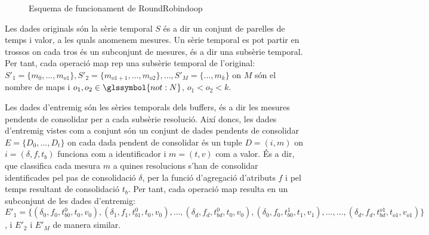 \begin{figure}[tp]
  
  \caption{Esquema de funcionament de RoundRobindoop}
  \label{fig:roundrobindoop:esquema}
\end{figure}






Les dades originals són la sèrie temporal $S$ és a dir un conjunt de
parelles de temps i valor, a les quals anomenem mesures. Un sèrie
temporal es pot partir en trossos on cada tros és un subconjunt de
mesures, és a dir una subsèrie temporal. Per tant, cada operació map
rep una subsèrie temporal de l'original: $S'_1 =
\{m_0,\dotsc,m_{o1}\}, S'_2 = \{m_{o1+1},\dotsc,m_{o2}\}, \dotsc, S'_M
= \{\dotsc,m_{k}\}$ on $M$ són el nombre de maps i $o_1,o_2\in
\glssymbol{not:N}$, $o_1 < o_2 < k$.



Les dades d'entremig són les sèries temporals dels buffers, és a dir
les mesures pendents de consolidar per a cada subsèrie resolució.
Així doncs, les dades d'entremig vistes com a conjunt són un conjunt
de dades pendents de consolidar $E=\{ D_{0}, \dotsc, D_t\}$  on cada dada pendent de consolidar és un tuple
$D=(i,m)$ on $i=(\delta,f,t_b)$ funciona com a identificador i
$m=(t,v)$ com a valor.  És a dir, que classifica cada mesura $m$ a
quines resolucions s'han de consolidar identificades pel pas de
consolidació $\delta$, per la funció d'agregació d'atributs $f$ i pel
temps resultant de consolidació $t_b$. Per tant, cada operació map
resulta en un subconjunt de les dades d'entremig: $E'_1=\{
(\delta_0,f_0, t_{b0}^0, t_0,v_0), (\delta_1,f_1, t_{b1}^0, t_0,v_0),
\dotsc , (\delta_d,f_d, t_{bd}^0, t_0,v_0), (\delta_0,f_0, t_{b0}^1,
t_1,v_1), \dotsc, \dotsc, (\delta_d,f_d, t_{bd}^{o1}, t_{o1},v_{o1})
\}$, i $E'_2$ i $E'_M$ de manera similar.



